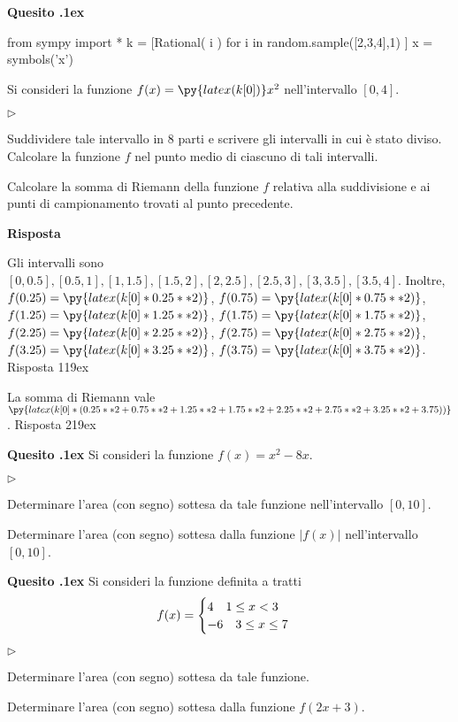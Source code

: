 \documentclass[11pt,twoside,a4paper]{article}
\newcommand{\mylabel}[1]{#1\hfill}
\renewenvironment{itemize}
  {\begin{list}{$\triangleright$}{%
   \setlength{\parskip}{0mm}
   \setlength{\topsep}{.4\baselineskip}
   \setlength{\rightmargin}{0mm}
   \setlength{\listparindent}{0mm}
   \setlength{\itemindent}{0mm}
   \setlength{\labelwidth}{2ex}
   \setlength{\itemsep}{.4\baselineskip}
   \setlength{\parsep}{0mm}
   \setlength{\partopsep}{0mm}
   \setlength{\labelsep}{1ex}
   \setlength{\leftmargin}{\labelwidth+\labelsep}
   \let\makelabel\mylabel}}{%
   \end{list}\vspace*{-1.3mm}}
\newcounter{quesito}
\newenvironment{question}{\bigskip\addtocounter{quesito}{1}\bigskip\bigskip\par\textbf{Quesito \thequesito.\kern1ex}}{\vspace{\parskip}}
\newenvironment{answer}{\par\textbf{Risposta\quad}}{\vspace{\parskip}}
\begin{document}
\begin{question}
\begin{pycode}
from sympy import *
k = [Rational( i ) for i in random.sample([2,3,4],1) ]
x = symbols('x')
\end{pycode}
Si consideri la funzione $f(x) = \py{latex(k[0])}x^2$ nell'intervallo $[0,4]$.
\begin{itemize}
\item[1.] Suddividere tale intervallo in $8$ parti e scrivere gli intervalli in cui \`e stato diviso. Calcolare la funzione $f$ nel punto medio di ciascuno di tali intervalli.
\item[2.] Calcolare la somma di Riemann della funzione $f$ relativa alla suddivisione e ai punti di campionamento trovati al punto precedente.
\end{itemize}
\begin{answer}

{\color{blue}
Gli intervalli sono $[0, 0.5], [0.5, 1], [1, 1.5], [1.5, 2], [2, 2.5], [2.5, 3], [3, 3.5], [3.5, 4]$.
Inoltre, $f(0.25) = \py{latex(k[0]*0.25**2)}$, $f(0.75) = \py{latex(k[0]*0.75**2)}$, $f(1.25) = \py{latex(k[0]*1.25**2)}$, $f(1.75) = \py{latex(k[0]*1.75**2)}$, $f(2.25) = \py{latex(k[0]*2.25**2)}$, $f(2.75) = \py{latex(k[0]*2.75**2)}$, $f(3.25) = \py{latex(k[0]*3.25**2)}$, $f(3.75) = \py{latex(k[0]*3.75**2)}$.
\hfill Risposta 1\kern19ex}

\smallskip
{\color{blue}La somma di Riemann vale $\py{latex(k[0]*(0.25**2+0.75**2+1.25**2+1.75**2+2.25**2+2.75**2+3.25**2+3.75))}$.
\hfill Risposta 2\kern19ex}

\end{answer}
\end{question}
\begin{question}
Si consideri la funzione $f(x) = x^2 - 8x$.
\begin{itemize}
\item[1.] Determinare l'area (con segno) sottesa da tale funzione nell'intervallo $[0, 10]$.
\item[2.] Determinare l'area (con segno) sottesa dalla funzione $\lvert f(x) \rvert$ nell'intervallo $[0, 10]$.
\end{itemize}
\end{question}
\begin{question}
Si consideri la funzione definita a tratti 
\[f(x) = \begin{cases} 4 \quad 1 \leq x < 3 \cr -6 \quad 3 \leq x \leq 7 \end{cases}\]
\begin{itemize}
\item[1.] Determinare l'area (con segno) sottesa da tale funzione.
\item[2.] Determinare l'area (con segno) sottesa dalla funzione $f(2x + 3)$.
\end{itemize}
\end{question}
\end{document}
